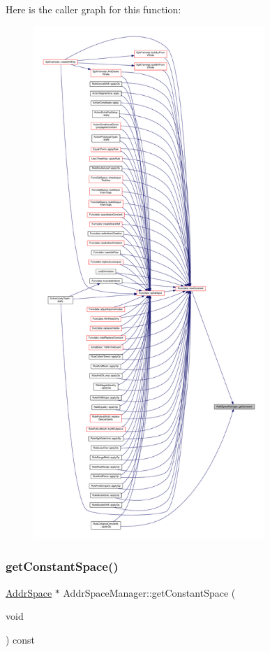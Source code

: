 Here is the caller graph for this function\+:
\nopagebreak
\begin{figure}[H]
\begin{center}
\leavevmode
\includegraphics[height=550pt]{class_addr_space_manager_aadd44852a41fe18966cce35b5abd15de_icgraph}
\end{center}
\end{figure}
\mbox{\label{class_addr_space_manager_ab7dec6a4f5671fffb5d5645ebd2cb1f4}} 
\subsubsection{\texorpdfstring{getConstantSpace()}{getConstantSpace()}}
{\footnotesize\ttfamily \mbox{\hyperlink{class_addr_space}{Addr\+Space}} $\ast$ Addr\+Space\+Manager\+::get\+Constant\+Space (\begin{DoxyParamCaption}\item[{void}]{ }\end{DoxyParamCaption}) const\hspace{0.3cm}{\ttfamily [inline]}}



